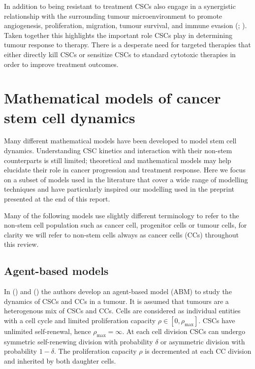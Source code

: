 \documentclass[
  letterpaper,
]{scrreprt}
\theoremstyle{definition}
\theoremstyle{remark}
\begin{document}
In addition to being resistant to treatment CSCs also engage in a
synergistic relationship with the surrounding tumour microenvironment to
promote angiogenesis, proliferation, migration, tumour survival, and
immune evasion (;
). Taken together this highlights the
important role CSCs play in determining tumour response to therapy.
There is a desperate need for targeted therapies that either directly
kill CSCs or sensitize CSCs to standard cytotoxic therapies in order to
improve treatment outcomes.

\section{Mathematical models of cancer stem cell
dynamics}\label{sec-mathematical-models-of-cancer-stem-cell-dynamics}

Many different mathematical models have been developed to model stem
cell dynamics. Understanding CSC kinetics and interaction with their
non-stem counterparts is still limited; theoretical and mathematical
models may help elucidate their role in cancer progression and treatment
response. Here we focus on a subset of models used in the literature
that cover a wide range of modelling techniques and have particularly
inspired our modelling used in the preprint presented at the end of this
report.

Many of the following models use slightly different terminology to refer
to the non-stem cell population such as cancer cell, progenitor cells or
tumour cells, for clarity we will refer to non-stem cells always as
cancer cells (CCs) throughout this review.

\subsection{Agent-based models}\label{sec-agent-based-model}

In () and
() the authors develop an
agent-based model (ABM) to study the dynamics of CSCs and CCs in a
tumour. It is assumed that tumours are a heterogenous mix of CSCs and
CCs. Cells are considered as individual entities with a cell cycle and
limited proliferation capacity \(\rho \in [0,\rho_\text{max}]\). CSCs
have unlimited self-renewal, hence \(\rho_\text{max} = \infty\). At each
cell division CSCs can undergo symmetric self-renewing division with
probability \(\delta\) or asymmetric division with probability
\(1-\delta\). The proliferation capacity \(\rho\) is decremented at each
CC division and inherited by both daughter cells.
\end{document}
